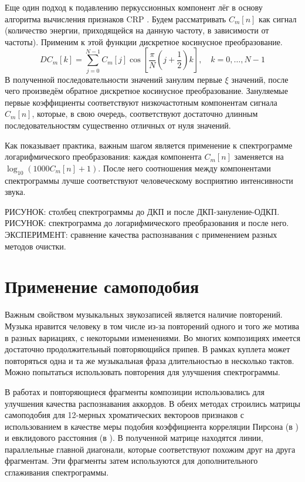Еще один подход к подавлению перкуссионных компонент лёг в основу алгоритма
вычисления признаков CRP \cite{Mueller2009}. Будем рассматривать $C_m[n]$ как
сигнал (количество энергии, приходящейся на данную частоту, в зависимости от
частоты). Применим к этой функции дискретное косинусное преобразование.
$$ DC_m[k] = \sum\limits_{j=0}^{N-1} C_m[j] \cos\left[ \frac{\pi}{N} \left(
j+\frac{1}{2} \right) k \right], \quad k=0, \ldots, N-1 $$
В полученной последовательности значений занулим первые $\xi$ значений, после
чего произведём обратное дискретное косинусное преобразование. Зануляемые первые
коэффициенты соответствуют низкочастотным компонентам сигнала $C_m[n]$, которые,
в свою очередь, соответствуют достаточно длинным последовательностям существенно
отличных от нуля значений.

Как показывает практика, важным шагом является применение к спектрограмме
логарифмического преобразования: каждая компонента $C_m[n]$ заменяется на
$\log_{10}(1000 C_m[n] + 1)$. После него соотношения между компонентами
спектрограммы лучше соответствуют человеческому восприятию интенсивности звука.

РИСУНОК: столбец спектрограммы до ДКП и после ДКП-зануление-ОДКП.
РИСУНОК: спектрограмма до логарифмического преобразования и после него.
ЭКСПЕРИМЕНТ: сравнение качества распознавания с применением разных методов
очистки.

\section{Применение самоподобия} \label{sect1_selfsim}

Важным свойством музыкальных звукозаписей является наличие повторений. Музыка
нравится человеку в том числе из-за повторений одного и того же мотива в разных
вариациях, с некоторыми изменениями. Во многих композициях имеется достаточно
продолжительный повторяющийся припев. В рамках куплета может повторяться одна и
та же музыкальная фраза длительностью в несколько тактов. Можно попытаться
использовать повторения для улучшения спектрограммы.

В работах \cite{Mauch2010} и \cite{Cho2011} повторяющиеся фрагменты композиции
использовались для улучшения качества распознавания аккордов. В обеих методах
строились матрицы самоподобия для 12-мерных хроматических вектороов признаков с
использованием в качестве меры подобия коэффициента корреляции Пирсона (в
\cite{Mauch2010}) и евклидового расстояния (в \cite{Cho2011}). В полученной
матрице находятся линии, параллельные главной диагонали, которые соответствуют
похожим друг на друга фрагментам. Эти фрагменты затем используются для
дополнительного сглаживания спектрограммы.

